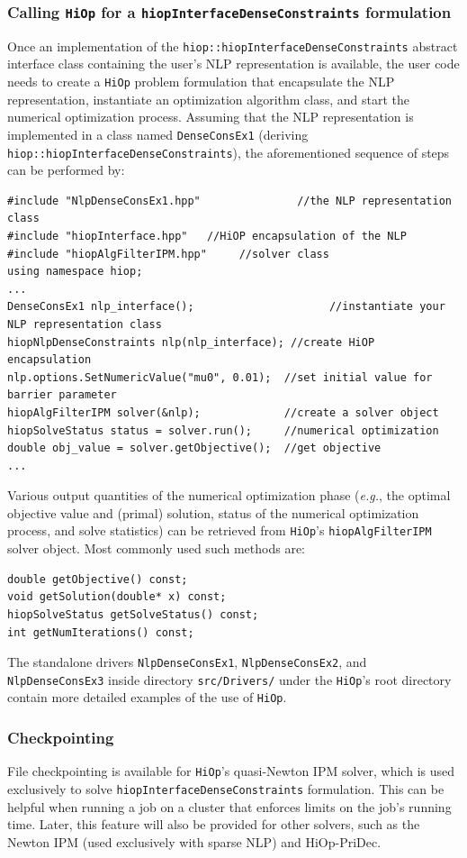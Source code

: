 \documentclass[11pt]{article}
\newcommand{\Hi}{\texttt{HiOp}\xspace}
\begin{document}
\subsubsection{Calling \Hi for a \texttt{hiopInterfaceDenseConstraints} formulation}
Once an implementation of the \texttt{hiop::hiopInterfaceDenseConstraints} abstract interface class containing the user's NLP representation is available, the  user code needs to create a \Hi problem formulation that encapsulate the NLP representation, instantiate an optimization algorithm class, and start the numerical optimization process. Assuming that the NLP representation is implemented in a class named \texttt{DenseConsEx1} (deriving \texttt{hiop::hiopInterfaceDenseConstraints}), the aforementioned sequence of steps can be performed by:
\begin{lstlisting}
#include "NlpDenseConsEx1.hpp"               //the NLP representation class
#include "hiopInterface.hpp"   //HiOP encapsulation of the NLP
#include "hiopAlgFilterIPM.hpp"     //solver class
using namespace hiop;
...
DenseConsEx1 nlp_interface();                     //instantiate your NLP representation class
hiopNlpDenseConstraints nlp(nlp_interface); //create HiOP encapsulation
nlp.options.SetNumericValue("mu0", 0.01);  //set initial value for  barrier parameter
hiopAlgFilterIPM solver(&nlp);             //create a solver object
hiopSolveStatus status = solver.run();     //numerical optimization
double obj_value = solver.getObjective();  //get objective
...
\end{lstlisting}
Various output quantities of the numerical optimization phase (\textit{e.g.}, the optimal objective value and (primal) solution, status of the numerical optimization process, and solve statistics) can be retrieved from \Hi's \texttt{hiopAlgFilterIPM} solver object. Most commonly used such methods are: 
\begin{lstlisting}
double getObjective() const;
void getSolution(double* x) const;
hiopSolveStatus getSolveStatus() const;
int getNumIterations() const;
\end{lstlisting} 
The standalone drivers \texttt{NlpDenseConsEx1}, \texttt{NlpDenseConsEx2}, and \texttt{NlpDenseConsEx3} inside directory \texttt{src/Drivers/} under the \Hi's root directory contain more detailed examples of the use of \Hi.

\subsubsection{Checkpointing}\label{sec:checkpoint_API}
File checkpointing is available for \Hi's quasi-Newton IPM solver, which is used exclusively to solve \texttt{hiopInterfaceDenseConstraints} formulation. This can be helpful when running a job on
a cluster that enforces limits on the job’s running time.
Later, this feature will also be provided for other solvers, such as the Newton IPM (used exclusively with sparse NLP) and HiOp-PriDec.
\end{document}
